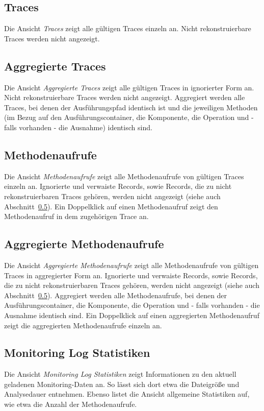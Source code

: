 \documentclass{article}
\begin{document}
  \subsection{Traces}
  Die Ansicht \textit{Traces} zeigt alle gültigen Traces einzeln an.
  Nicht rekonstruierbare Traces werden nicht angezeigt.

  \subsection{Aggregierte Traces}
  Die Ansicht \textit{Aggregierte Traces} zeigt alle gültigen Traces in ignorierter Form an.
  Nicht rekonstruierbare Traces werden nicht angezeigt.
  Aggregiert werden alle Traces, bei denen der Ausführungspfad identisch ist und die jeweiligen Methoden (im Bezug auf den Ausführungscontainer, die Komponente, die Operation und - falls vorhanden - die Ausnahme) identisch sind.


  \subsection{Methodenaufrufe}
  Die Ansicht \textit{Methodenaufrufe} zeigt alle Methodenaufrufe von gültigen Traces einzeln an.
  Ignorierte und verwaiste Records, sowie Records, die zu nicht rekonstruierbaren Traces gehören, werden nicht angezeigt (siehe auch Abschnitt~\ref{MonitoringLogStatistiken}).
  Ein Doppelklick auf einen Methodenaufruf zeigt den Methodenaufruf in dem zugehörigen Trace an.

  \subsection{Aggregierte Methodenaufrufe}
  Die Ansicht \textit{Aggregierte Methodenaufrufe} zeigt alle Methodenaufrufe von gültigen Traces in aggregierter Form an.
  Ignorierte und verwaiste Records, sowie Records, die zu nicht rekonstruierbaren Traces gehören, werden nicht angezeigt (siehe auch Abschnitt~\ref{MonitoringLogStatistiken}).
  Aggregiert werden alle Methodenaufrufe, bei denen der Ausführungscontainer, die Komponente, die Operation und - falls vorhanden - die Ausnahme identisch sind.
  Ein Doppelklick auf einen aggregierten Methodenaufruf zeigt die aggregierten Methodenaufrufe einzeln an.
  
  \subsection{Monitoring Log Statistiken}\label{MonitoringLogStatistiken}
  Die Ansicht \textit{Monitoring Log Statistiken} zeigt Informationen zu den aktuell geladenen Monitoring-Daten an.
  So lässt sich dort etwa die Dateigröße und Analysedauer entnehmen.
  Ebenso listet die Ansicht allgemeine Statistiken auf, wie etwa die Anzahl der Methodenaufrufe.\\
\end{document}
